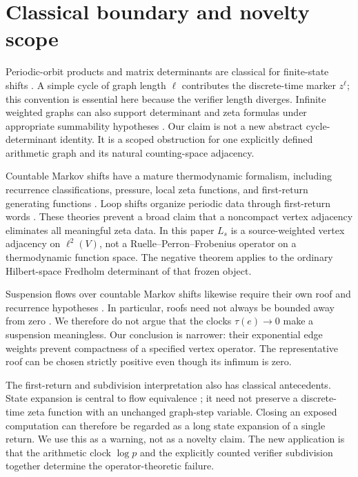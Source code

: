\section{Classical boundary and novelty scope}
\label{sec:boundary}

Periodic-orbit products and matrix determinants are classical for
finite-state shifts \citep{BowenLanford1970}.  A simple cycle of graph length
$\ell$ contributes the discrete-time marker $z^\ell$; this convention is
essential here because the verifier length diverges.  Infinite weighted
graphs can also support determinant and zeta formulas under appropriate
summability hypotheses \citep{Deitmar2015}.  Our claim is not a new abstract
cycle-determinant identity.  It is a scoped obstruction for one explicitly
defined arithmetic graph and its natural counting-space adjacency.

Countable Markov shifts have a mature thermodynamic formalism, including
recurrence classifications, pressure, local zeta functions, and
first-return generating functions \citep{GurevichSavchenko1998,Sarig1999}.
Loop shifts organize periodic data through first-return words
\citep{BoyleBuzziGomez2006}.  These theories prevent a broad claim that a
noncompact vertex adjacency eliminates all meaningful zeta data.  In this
paper $L_s$ is a source-weighted vertex adjacency on $\ell^2(V)$, not a
Ruelle--Perron--Frobenius operator on a thermodynamic function space.  The
negative theorem applies to the ordinary Hilbert-space Fredholm determinant
of that frozen object.

Suspension flows over countable Markov shifts likewise require their own roof
and recurrence hypotheses \citep{BarreiraIommi2006}.  In particular, roofs
need not always be bounded away from zero
\citep{IommiJordanTodd2015}.  We therefore do not argue that the clocks
$\tau(e)\to0$ make a suspension meaningless.  Our conclusion is narrower:
their exponential edge weights prevent compactness of a specified vertex
operator.  The representative roof can be chosen strictly positive even
though its infimum is zero.

The first-return and subdivision interpretation also has classical
antecedents.  State expansion is central to flow equivalence
\citep{ParrySullivan1975}; it need not preserve a discrete-time zeta function
with an unchanged graph-step variable.  Closing an exposed computation can
therefore be regarded as a long state expansion of a single return.  We use
this as a warning, not as a novelty claim.  The new application is that the
arithmetic clock $\log p$ and the explicitly counted verifier subdivision
together determine the operator-theoretic failure.

